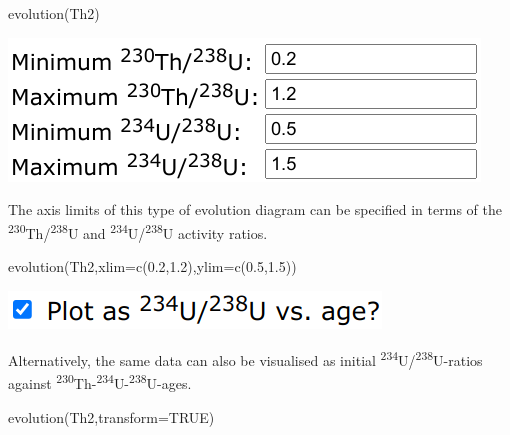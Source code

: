 \begin{refsection}
\begin{enumerate}
\begin{console}
evolution(Th2)
\end{console}

  \noindent\begin{minipage}[t]{.4\linewidth}
  \strut\vspace*{-\baselineskip}\newline
  \includegraphics[width=\linewidth]{../figures/ThUformat12evolutionLimits.png}
  \end{minipage}
  \begin{minipage}[t]{.6\linewidth}
    The axis limits of this type of evolution diagram can be specified in
    terms of the \textsuperscript{230}Th/\textsuperscript{238}U and
    \textsuperscript{234}U/\textsuperscript{238}U activity ratios.
  \end{minipage}

\begin{console}
evolution(Th2,xlim=c(0.2,1.2),ylim=c(0.5,1.5))
\end{console}

  \noindent\begin{minipage}[t]{.3\linewidth}
  \strut\vspace*{-\baselineskip}\newline
  \includegraphics[width=\linewidth]{../figures/ThUvsAge.png}
  \end{minipage}
  \begin{minipage}[t]{.7\linewidth}
    Alternatively, the same data can also be visualised as initial
    \textsuperscript{234}U/\textsuperscript{238}U-ratios against
    \textsuperscript{230}Th-\textsuperscript{234}U-\textsuperscript{238}U-ages.
  \end{minipage}

\begin{console}
evolution(Th2,transform=TRUE)
\end{console}


\end{enumerate}
\end{refsection}

